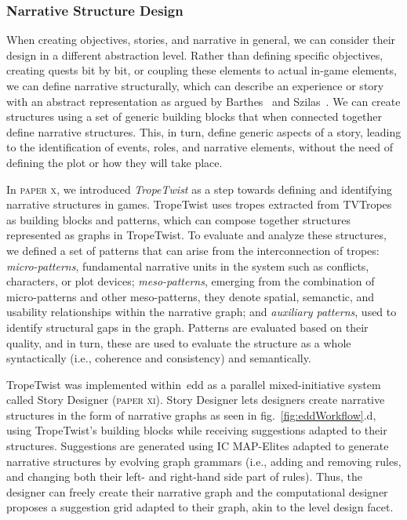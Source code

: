 
\subsubsection{Narrative Structure Design}

When creating objectives, stories, and narrative in general, we can consider their design in a different abstraction level. Rather than defining specific objectives, creating quests bit by bit, or coupling these elements to actual in-game elements, we can define narrative structurally, which can describe an experience or story with an abstract representation as argued by Barthes~\cite{barthes_introduction_1966} and Szilas~\cite{szilas_idtension_2003}. We can create structures using a set of generic building blocks that when connected together define narrative structures. This, in turn, define generic aspects of a story, leading to the identification of events, roles, and narrative elements, without the need of defining the plot or how they will take place.

In \textsc{paper x}, we introduced \emph{TropeTwist} as a step towards defining and identifying narrative structures in games. TropeTwist uses tropes extracted from TVTropes~\cite{richmond_tv_2004} as building blocks and patterns, which can compose together structures represented as graphs in TropeTwist. To evaluate and analyze these structures, we defined a set of patterns that can arise from the interconnection of tropes: \emph{micro-patterns}, fundamental narrative units in the system such as conflicts, characters, or plot devices; \emph{meso-patterns}, emerging from the combination of micro-patterns and other meso-patterns, they denote spatial, semanctic, and usability relationships within the narrative graph; and \emph{auxiliary patterns}, used to identify structural gaps in the graph. Patterns are evaluated based on their quality, and in turn, these are used to evaluate the structure as a whole syntactically (i.e., coherence and consistency) and semantically.

TropeTwist was implemented within~\acrshort{edd} as a parallel mixed-initiative system called Story Designer (\textsc{paper xi}). Story Designer lets designers create narrative structures in the form of narrative graphs as seen in fig.~\ref{fig:eddWorkflow}.d, using TropeTwist's building blocks while receiving suggestions adapted to their structures. Suggestions are generated using IC MAP-Elites adapted to generate narrative structures by evolving graph grammars (i.e., adding and removing rules, and changing both their left- and right-hand side part of rules). Thus, the designer can freely create their narrative graph and the computational designer proposes a suggestion grid adapted to their graph, akin to the level design facet. 


